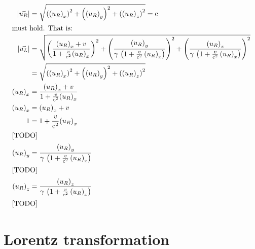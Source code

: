 \documentclass[pagesize,headsepline,10pt,parskip=half]{scrreprt}
\newcommand{\const}[1]{\mathrm{#1}}
\renewcommand{\c}{\const{c}}
\begin{document}
\begin{align*}
        \left|\vec{u_R}\right| &= \sqrt{
            {\left({\left(u_R\right)}_x\right)}^2
          + {\left({\left(u_R\right)}_y\right)}^2
          + {\left({\left(u_R\right)}_z\right)}^2
        } = \c{}\\
        \intertext{must hold.  That is:}
        \left|\vec{u_L}\right|
        &= \sqrt{
            {\left(\frac{{(u_R)}_x + v}{1 + \frac{v}{\c^2} {(u_R)}_x}\right)}^2 +
            {\left(\frac{{(u_R)}_y}{\gamma \, \left(1 + \frac{v}{\c^2} \, {(u_R)}_x\right)}\right)}^2 +
            {\left(\frac{{(u_R)}_z}{\gamma \, \left(1 + \frac{v}{\c^2} \, {(u_R)}_x\right)}\right)}^2
          }\\
        &= \sqrt{
              {\left({\left(u_R\right)}_x\right)}^2
            + {\left({\left(u_R\right)}_y\right)}^2
            + {\left({\left(u_R\right)}_z\right)}^2
          }\\
        {\left(u_R\right)}_x
          &= \frac{{(u_R)}_x + v}{1 + \frac{v}{\c^2} {(u_R)}_x}\\
        {\left(u_R\right)}_x &= {(u_R)}_x + v\\
        1  &= 1 + \frac{v}{\c^2} {(u_R)}_x\\
          \intertext{[TODO]}
        {\left(u_R\right)}_y
          &= \frac{{(u_R)}_y}{\gamma \, \left(1 + \frac{v}{\c^2} \, {(u_R)}_x\right)}\\
          \intertext{[TODO]}
        {\left(u_R\right)}_z
          &= \frac{{(u_R)}_z}{\gamma \, \left(1 + \frac{v}{\c^2} \, {(u_R)}_x\right)}\\
          \intertext{[TODO]}
      \end{align*}

    \section{Lorentz transformation}
\end{document}
